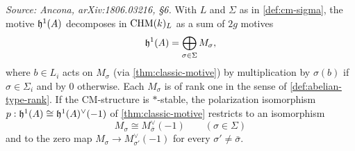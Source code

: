 \begin{proposition}[CM decomposition of \(\hh^1\)]
  \label{prop:decomposition}
  \textit{Source: Ancona, arXiv:1806.03216, §6.}
  With \(L\) and \(\Sigma\) as in \cref{def:cm-sigma}, the motive \(\mathfrak{h}^1(A)\)
  decomposes in \(\mathrm{CHM}(k)_{L}\) as a sum of \(2g\) motives
  \[\mathfrak{h}^1(A) = \bigoplus_{\sigma \in \Sigma} M_\sigma,\]
  where \(b \in L_i\) acts on \(M_\sigma\) (via \cref{thm:classic-motive}) by
  multiplication by \(\sigma(b)\) if \(\sigma \in \Sigma_i\) and by \(0\)
  otherwise. Each \(M_\sigma\) is of rank one in the sense of
  \cref{def:abelian-type-rank}. If the CM-structure is \(*\)-stable, the
  polarization isomorphism \(p : \mathfrak{h}^1(A) \cong \mathfrak{h}^1(A)^{\vee}(-1)\) of
  \cref{thm:classic-motive} restricts to an isomorphism
  \[M_\sigma \cong M_{\bar\sigma}^\vee(-1) \qquad (\sigma \in \Sigma)\]
  and to the zero map \(M_\sigma \to M_{\sigma'}^\vee(-1)\) for every
  \(\sigma' \neq \bar\sigma\).
\end{proposition}

